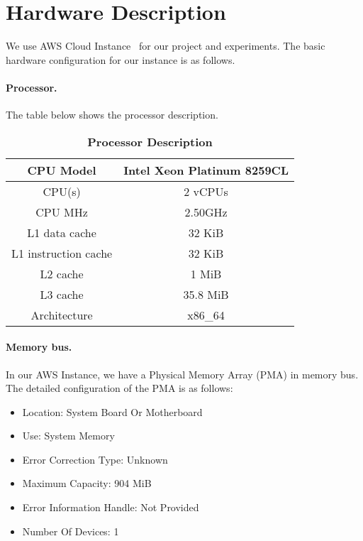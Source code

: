 \section{Hardware Description}
\label{sec:hardware}
We use AWS Cloud Instance~\cite{awsi4} for our project and experiments. The basic hardware configuration for our instance is as follows.

\paragraph{Processor.} The table below shows the processor description.
\begin{table}[h]
	\centering
	\begin{tabular}{c|c}
		\hline
		CPU Model & Intel Xeon Platinum 8259CL  \\ \hline
		
		CPU(s) & 2 vCPUs \\ \hline

		CPU MHz & 2.50GHz \\ \hline
		
		L1 data cache & 32 KiB \\ \hline
		L1 instruction cache & 32 KiB \\ \hline
		L2 cache & 1 MiB \\ \hline
		L3 cache & 35.8 MiB \\ \hline
		Architecture & x86\_64 \\ \hline
	\end{tabular}
	\caption{\textbf{Processor Description}}
	\label{table:sys-conf}
\end{table}

\paragraph{Memory bus.} In our AWS Instance, we have a Physical Memory Array (PMA) in memory bus. The detailed configuration of the PMA is as follows:
\begin{itemize}[leftmargin=*]
	\item Location: System Board Or Motherboard
	\item Use: System Memory
	\item Error Correction Type: Unknown
	\item Maximum Capacity: 904 MiB
	\item Error Information Handle: Not Provided
	\item Number Of Devices: 1
\end{itemize}

